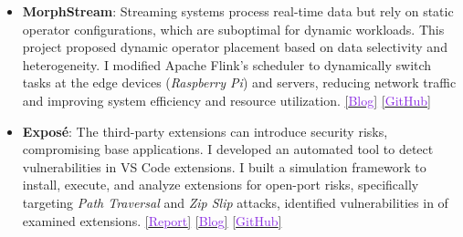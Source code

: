\begin{itemize}[topsep=0pt, itemsep=0.35em, parsep=0.5pt]


  \item \textbf{MorphStream}: 
  Streaming systems process real-time data but rely on static operator configurations, which are suboptimal for dynamic workloads.
  This project proposed dynamic operator placement based on data selectivity and heterogeneity.
  I modified Apache Flink's scheduler to dynamically switch tasks at the edge devices (\textit{Raspberry Pi}) and servers, reducing network traffic and improving system efficiency and resource utilization.
  \href{https://shubhamkaushik.com/projects/heterogeneity_aware_operator_placement_for_stream_processing_systems_at_the_edge/}{[\textcolor{blueviolet}{Blog}]} \href{https://github.com/shubham-sudo/HeterogeneityAwareOperatorPlacementforStreamProcessingSystemsAtEdge-RaspberryPi}{[\textcolor{blueviolet}{GitHub}]}



  \item \textbf{Expos\'{e}}: 
  The third-party extensions can introduce security risks, compromising base applications.
  I developed an automated tool to detect vulnerabilities in VS Code extensions. 
  I built a simulation framework to install, execute, and analyze extensions for open-port risks, specifically targeting 
  \textit{Path Traversal} and \textit{Zip Slip} attacks, identified vulnerabilities in  of examined extensions.
  \href{https://shubhamkaushik.com/assets/pdf/vulnerabilities_in_vs_code.pdf}{[\textcolor{blueviolet}{Report}]} \href{https://shubhamkaushik.com/projects/finding_vulnuerbilities_in_VS_Code_extensions/}{[\textcolor{blueviolet}{Blog}]} \href{https://github.com/prateekdceit06/VSCode-Extensions-Simulator}{[\textcolor{blueviolet}{GitHub}]}


\end{itemize}
